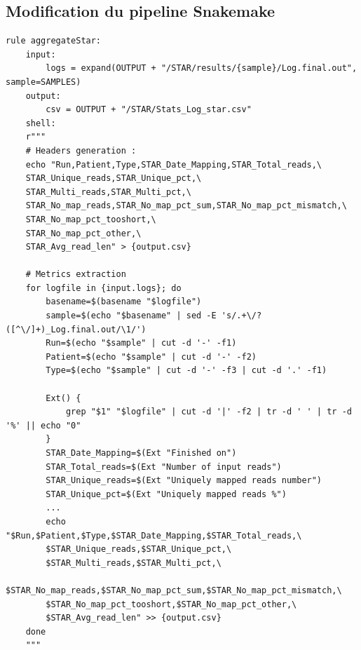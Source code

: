 \subsection{Modification du pipeline Snakemake}
\label{annexe:snake_ali}
   \centering
 \begin{lstlisting}[style=makefileStyle,caption={\underline{Règle Snakemake \texttt{aggregateStar} pour l'extraction des statistiques STAR}}]
rule aggregateStar:
    input:
        logs = expand(OUTPUT + "/STAR/results/{sample}/Log.final.out", sample=SAMPLES)
    output:
        csv = OUTPUT + "/STAR/Stats_Log_star.csv"
    shell:
    r"""
    # Headers generation :
    echo "Run,Patient,Type,STAR_Date_Mapping,STAR_Total_reads,\
    STAR_Unique_reads,STAR_Unique_pct,\
    STAR_Multi_reads,STAR_Multi_pct,\
    STAR_No_map_reads,STAR_No_map_pct_sum,STAR_No_map_pct_mismatch,\
    STAR_No_map_pct_tooshort,\
    STAR_No_map_pct_other,\
    STAR_Avg_read_len" > {output.csv}

    # Metrics extraction
    for logfile in {input.logs}; do
        basename=$(basename "$logfile")
        sample=$(echo "$basename" | sed -E 's/.+\/?([^\/]+)_Log.final.out/\1/')
        Run=$(echo "$sample" | cut -d '-' -f1)
        Patient=$(echo "$sample" | cut -d '-' -f2)
        Type=$(echo "$sample" | cut -d '-' -f3 | cut -d '.' -f1)

        Ext() {
            grep "$1" "$logfile" | cut -d '|' -f2 | tr -d ' ' | tr -d '%' || echo "0"
        }
        STAR_Date_Mapping=$(Ext "Finished on")
        STAR_Total_reads=$(Ext "Number of input reads")
        STAR_Unique_reads=$(Ext "Uniquely mapped reads number")
        STAR_Unique_pct=$(Ext "Uniquely mapped reads %")
        ...
        echo "$Run,$Patient,$Type,$STAR_Date_Mapping,$STAR_Total_reads,\
        $STAR_Unique_reads,$STAR_Unique_pct,\
        $STAR_Multi_reads,$STAR_Multi_pct,\
        $STAR_No_map_reads,$STAR_No_map_pct_sum,$STAR_No_map_pct_mismatch,\
        $STAR_No_map_pct_tooshort,$STAR_No_map_pct_other,\
        $STAR_Avg_read_len" >> {output.csv}
    done
    """
\end{lstlisting}

